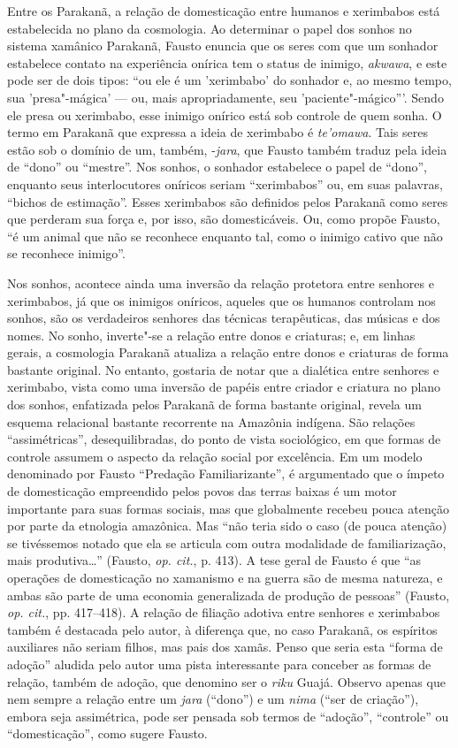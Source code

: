 Entre os Parakanã, a relação de domesticação entre humanos e xerimbabos
está estabelecida no plano da cosmologia. Ao determinar o papel dos
sonhos no sistema xamânico Parakanã, Fausto enuncia que os seres com que
um sonhador estabelece contato na experiência onírica tem o status de
inimigo, \emph{akwawa}, e este pode ser de dois tipos: ``ou ele é um
'xerimbabo' do sonhador e, ao mesmo tempo, sua 'presa"-mágica' --- ou, mais
apropriadamente, seu 'paciente"-mágico'''. Sendo ele presa ou xerimbabo,
esse inimigo onírico está sob controle de quem sonha. O termo em
Parakanã que expressa a ideia de xerimbabo é \emph{te'omawa}. Tais seres
estão sob o domínio de um, também, -\emph{jara}, que Fausto também
traduz pela ideia de ``dono'' ou ``mestre''. Nos sonhos, o sonhador
estabelece o papel de ``dono'', enquanto seus interlocutores oníricos
seriam ``xerimbabos'' ou, em suas palavras, ``bichos de estimação''. Esses
xerimbabos são definidos pelos Parakanã como seres que perderam sua
força e, por isso, são domesticáveis. Ou, como propõe Fausto, ``é um
animal que não se reconhece enquanto tal, como o inimigo cativo que não
se reconhece inimigo''.

Nos sonhos, acontece ainda uma inversão da relação protetora entre
senhores e xerimbabos, já que os inimigos oníricos, aqueles que os
humanos controlam nos sonhos, são os verdadeiros senhores das técnicas
terapêuticas, das músicas e dos nomes. No sonho, inverte"-se a relação
entre donos e criaturas; e, em linhas gerais, a cosmologia Parakanã
atualiza a relação entre donos e criaturas de forma bastante original.
No entanto, gostaria de notar que a dialética entre senhores e
xerimbabo, vista como uma inversão de papéis entre criador e criatura no
plano dos sonhos, enfatizada pelos Parakanã de forma bastante original,
revela um esquema relacional bastante recorrente na Amazônia indígena.
São relações ``assimétricas'', desequilibradas, do ponto de vista
sociológico, em que formas de controle assumem o aspecto da relação
social por excelência. Em um modelo denominado por Fausto ``Predação
Familiarizante'', é argumentado que o ímpeto de domesticação empreendido
pelos povos das terras baixas é um motor importante para suas formas
sociais, mas que globalmente recebeu pouca atenção por parte da
etnologia amazônica. Mas ``não teria sido o caso (de pouca atenção) se
tivéssemos notado que ela se articula com outra modalidade de
familiarização, mais produtiva\ldots{}'' (Fausto, \emph{op. cit.}, p. 413). A tese
geral de Fausto é que ``as operações de domesticação no xamanismo e na
guerra são de mesma natureza, e ambas são parte de uma economia
generalizada de produção de pessoas'' (Fausto, \emph{op. cit.}, pp. 417--418). A
relação de filiação adotiva entre senhores e xerimbabos também é
destacada pelo autor, à diferença que, no caso Parakanã, os espíritos
auxiliares não seriam filhos, mas pais dos xamãs. Penso que seria esta
``forma de adoção'' aludida pelo autor uma pista interessante para
conceber as formas de relação, também de adoção, que denomino ser o
\emph{riku} Guajá. Observo apenas que nem sempre a relação entre um
\emph{jara} (``dono'') e um \emph{nima} (``ser de criação''), embora seja
assimétrica, pode ser pensada sob termos de ``adoção'', ``controle'' ou
``domesticação'', como sugere Fausto.

